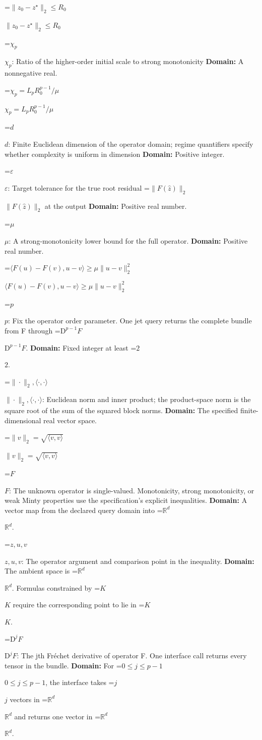 \documentclass[10pt,a4paper]{article}
\newcommand{\AtlasMath}[1]{\par\begingroup\centering\setbox0=\hbox{$\displaystyle #1$}\ifdim\wd0>1.4\linewidth\typeout{ATLAS WIDE FORMULA: \the\wd0}\fi\ifdim\wd0>\linewidth\resizebox{\linewidth}{!}{\box0}\else\box0\fi\par\endgroup}
\newcommand{\AtlasInlineMath}[1]{\begingroup\setbox0=\hbox{$#1$}\ifdim\wd0>.4\linewidth\endgroup\AtlasMath{#1}\else\endgroup$#1$\fi}
\begin{document}
\AtlasInlineMath{\|z_0-z^\star\|_2\le R_0}

\AtlasInlineMath{\chi_p}: Ratio of the higher-order initial scale to strong monotonicity \textbf{Domain:} A nonnegative real.

\AtlasInlineMath{\chi_p=L_pR_0^{p-1}/\mu}

\AtlasInlineMath{d}: Finite Euclidean dimension of the operator domain; regime quantifiers specify whether complexity is uniform in dimension \textbf{Domain:} Positive integer.

\AtlasInlineMath{\varepsilon}: Target tolerance for the true root residual \AtlasInlineMath{\|F(\widehat z)\|_2} at the output \textbf{Domain:} Positive real number.

\AtlasInlineMath{\mu}: A strong-monotonicity lower bound for the full operator. \textbf{Domain:} Positive real number.

\AtlasInlineMath{\langle F(u)-F(v),u-v\rangle\ge\mu\|u-v\|_2^2}

\AtlasInlineMath{p}: Fix the operator order parameter. One jet query returns the complete bundle from F through \AtlasInlineMath{\mathrm D^{p-1}F}. \textbf{Domain:} Fixed integer at least \AtlasInlineMath{2}.

\AtlasInlineMath{\|\cdot\|_2,\langle\cdot,\cdot\rangle}: Euclidean norm and inner product; the product-space norm is the square root of the sum of the squared block norms. \textbf{Domain:} The specified finite-dimensional real vector space.

\AtlasInlineMath{\|v\|_2=\sqrt{\langle v,v\rangle}}

\AtlasInlineMath{F}: The unknown operator is single-valued. Monotonicity, strong monotonicity, or weak Minty properties use the specification’s explicit inequalities. \textbf{Domain:} A vector map from the declared query domain into \AtlasInlineMath{\mathbb R^d}.

\AtlasInlineMath{z,u,v}: The operator argument and comparison point in the inequality. \textbf{Domain:} The ambient space is \AtlasInlineMath{\mathbb R^d}. Formulas constrained by \AtlasInlineMath{K} require the corresponding point to lie in \AtlasInlineMath{K}.

\AtlasInlineMath{\mathrm D^jF}: The jth Fréchet derivative of operator F. One interface call returns every tensor in the bundle. \textbf{Domain:} For \AtlasInlineMath{0\le j\le p-1}, the interface takes \AtlasInlineMath{j} vectors in \AtlasInlineMath{\mathbb R^d} and returns one vector in \AtlasInlineMath{\mathbb R^d}.
\end{document}
